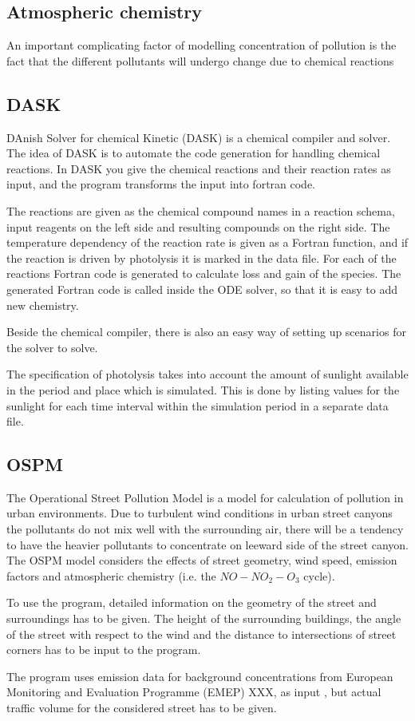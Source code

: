 \subsection{Atmospheric chemistry}
An important complicating factor of modelling concentration of pollution is the fact that the different pollutants will undergo change due to chemical reactions



\subsection{DASK}
DAnish Solver for chemical Kinetic (DASK) is a chemical compiler and solver. The idea of DASK is to automate the code generation for handling chemical reactions. In DASK you give the chemical reactions and their reaction rates as input, and the program transforms the input into fortran code.  

The reactions are given as the chemical compound names in a reaction schema, input reagents on the left side and resulting compounds on the right side. The temperature dependency of the reaction rate is given as a Fortran function, and if the reaction is driven by photolysis it is marked in the data file. For each of the reactions Fortran code is generated to calculate loss and gain of the species. The generated Fortran code is called inside the ODE solver, so that it is easy to add new chemistry.

Beside the chemical compiler, there is also an easy way of setting up scenarios for the solver to solve. 

The specification of photolysis takes into account the amount of sunlight available in the period and place which is simulated. This is done by listing values for the sunlight for each time interval within the simulation period in a separate data file.

\subsection{OSPM}
The Operational Street Pollution Model is a model for calculation of pollution in urban environments. Due to turbulent wind conditions in urban street canyons the pollutants do not mix well with the surrounding air, there will be a tendency to have the heavier pollutants to concentrate on leeward side of the street canyon. The OSPM model considers the effects of street geometry, wind speed, emission factors and atmospheric chemistry (i.e. the $NO - NO_2 - O_3$ cycle).

To use the program, detailed information on the geometry of the street and surroundings has to be given. The height of the surrounding buildings, the angle of the street with respect to the wind and the distance to intersections of street corners has to be input to the program.

The program uses emission data for background concentrations from European Monitoring and Evaluation Programme (EMEP) XXX, as input , but actual traffic volume for the considered street has to be given.





